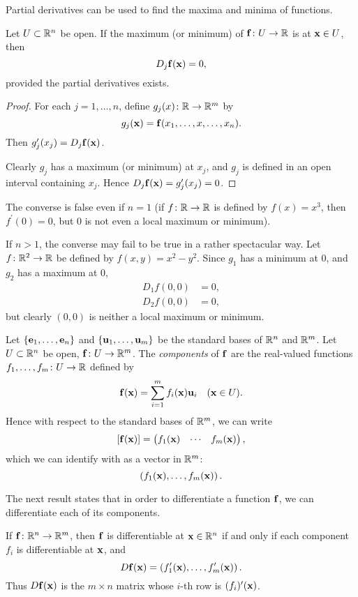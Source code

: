 Partial derivatives can be used to find the maxima and minima of functions.

\begin{proposition}
Let $U\subset\mathbb R^n$ be open. If the maximum (or minimum) of $\vb{f}\colon U\to\mathbb R$ is at $\vb{x}\in U$, then
\[D_j\vb{f}(\vb{x})=0,\]
provided the partial derivatives exists.
\end{proposition}

\begin{proof}
For each $j=1,\dots,n$, define $g_j(x)\colon\mathbb R\to\mathbb R^m$ by
\[g_j(\vb{x})=\vb{f}(x_1,\dots,x,\dots,x_n).\]
Then $g_j^\prime(x_j)=D_j\vb{f}(\vb{x})$. 

Clearly $g_j$ has a maximum (or minimum) at $x_j$, and $g_j$ is defined in an open interval containing $x_j$. Hence $D_j\vb{f}(\vb{x})=g_j^\prime(x_j)=0$.
\end{proof}

\begin{remark}
The converse is false even if $n=1$ (if $f\colon\mathbb R\to\mathbb R$ is defined by $f(x)=x^3$, then $f^\prime(0)=0$, but $0$ is not even a local maximum or minimum). 

If $n>1$, the converse may fail to be true in a rather spectacular way. Let $f\colon\mathbb R^2\to\mathbb R$ be defined by $f(x,y)=x^2-y^2$. Since $g_1$ has a minimum at $0$, and $g_2$ has a maximum at $0$,
\begin{align*}
D_1 f(0,0)&=0,\\
D_2 f(0,0)&=0,
\end{align*}
but clearly $(0,0)$ is neither a local maximum or minimum.
\end{remark}

Let $\{\vb{e}_1,\dots,\vb{e}_n\}$ and $\{\vb{u}_1,\dots,\vb{u}_m\}$ be the standard bases of $\mathbb R^n$ and $\mathbb R^m$.
Let $U\subset\mathbb R^n$ be open, $\vb{f}\colon U\to\mathbb R^m$. The \emph{components} of $\vb{f}$ are the real-valued functions $f_1,\dots,f_m\colon U\to\mathbb R$ defined by
\[\vb{f}(\vb{x})=\sum_{i=1}^{m}f_i(\vb{x})\vb{u}_i\quad(\vb{x}\in U).\]
Hence with respect to the standard bases of $\mathbb R^m$, we can write
\[[\vb{f}(\vb{x})]=\begin{pmatrix}
f_1(\vb{x})&\cdots&f_m(\vb{x})
\end{pmatrix},\]
which we can identify with as a vector in $\mathbb R^m$:
\[\left(f_1(\vb{x}),\dots,f_m(\vb{x})\right).\]

The next result states that in order to differentiate a function $\vb{f}$, we can differentiate each of its components.

\begin{lemma}
If $\vb{f}\colon\mathbb R^n\to\mathbb R^m$, then $\vb{f}$ is differentiable at $\vb{x}\in\mathbb R^n$ if and only if each component $f_i$ is differentiable at $\vb{x}$, and
\[D\vb{f}(\vb{x})=\left(f_1^\prime(\vb{x}),\dots,f_m^\prime(\vb{x})\right).\]
Thus $D\vb{f}(\vb{x})$ is the $m\times n$ matrix whose $i$-th row is $(f_i)^\prime(\vb{x})$.
\end{lemma}

